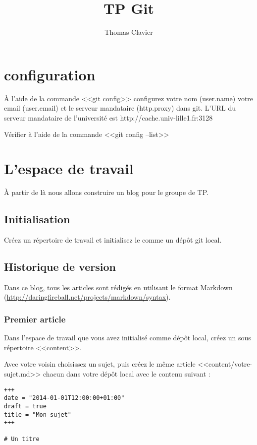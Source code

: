\documentclass[a4paper]{article}
\title{TP Git}
\author{Thomas Clavier}
\date{}
\begin{document}
\maketitle

\section{configuration}

À l'aide de la commande <<git config>> configurez votre nom (user.name) votre email (user.email) et le serveur mandataire (http.proxy) dans git. L'URL du serveur mandataire de l'université est http://cache.univ-lille1.fr:3128

Vérifier à l'aide de la commande <<git config --list>>

\section{L'espace de travail}

À partir de là nous allons construire un blog pour le groupe de TP.

\subsection{Initialisation}
Créez un répertoire de travail et initialisez le comme un dépôt git local.

\subsection{Historique de version}
Dans ce blog, tous les articles sont rédigés en utilisant le format Markdown (\url{http://daringfireball.net/projects/markdown/syntax}).

\subsubsection{Premier article}
Dans l'espace de travail que vous avez initialisé comme dépôt local, créez un sous répertoire <<content>>.

Avec votre voisin choisissez un sujet, puis créez le même article <<content/votre-sujet.md>> chacun dans votre dépôt local avec le contenu suivant : 

\begin{verbatim}
+++
date = "2014-01-01T12:00:00+01:00"
draft = true
title = "Mon sujet"
+++

# Un titre
\end{verbatim}
\end{document}
